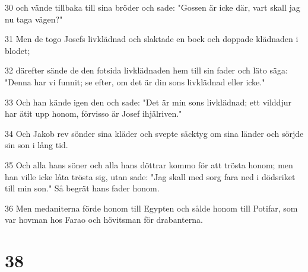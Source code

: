 \par 30 och vände tillbaka till sina bröder och sade: "Gossen är icke där, vart skall jag nu taga vägen?"
\par 31 Men de togo Josefs livklädnad och slaktade en bock och doppade klädnaden i blodet;
\par 32 därefter sände de den fotsida livklädnaden hem till sin fader och läto säga: "Denna har vi funnit; se efter, om det är din sons livklädnad eller icke."
\par 33 Och han kände igen den och sade: "Det är min sons livklädnad; ett vilddjur har ätit upp honom, förvisso är Josef ihjälriven."
\par 34 Och Jakob rev sönder sina kläder och svepte säcktyg om sina länder och sörjde sin son i lång tid.
\par 35 Och alla hans söner och alla hans döttrar kommo för att trösta honom; men han ville icke låta trösta sig, utan sade: "Jag skall med sorg fara ned i dödsriket till min son." Så begrät hans fader honom.
\par 36 Men medaniterna förde honom till Egypten och sålde honom till Potifar, som var hovman hos Farao och hövitsman för drabanterna.

\chapter{38}

